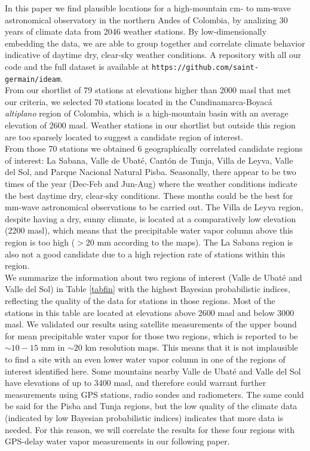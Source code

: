 \documentclass[12pt]{iopart}
\begin{document}
In this paper we find plausible locations for a high-mountain cm- to mm-wave astronomical observatory in the northern Andes of Colombia, by analizing 30 years of climate data from 2046 weather stations. By low-dimensionally embedding the data, we are able to group together and correlate climate behavior indicative of daytime dry, clear-sky weather conditions.  A repository with all our code and the full dataset is available at \texttt{https://github.com/saint-germain/ideam}.\\

From our shortlist of 79 stations at elevations higher than 2000 masl that met our criteria, we selected 70 stations located  in the Cundinamarca-Boyac\'a \emph{altiplano} region of Colombia, which is a high-mountain basin with an average elevation of 2600 masl. Weather stations in our shortlist but outside this region are too sparsely located to suggest a candidate region of interest. \\

From those 70 stations we obtained 6 geographically correlated candidate regions of interest: La Sabana, Valle de Ubat\'e, Cant\'on de Tunja, Villa de Leyva, Valle del Sol, and Parque Nacional Natural Pisba. Seasonally, there appear to be two times of the year (Dec-Feb and Jun-Aug) where the weather conditions indicate the best daytime dry, clear-sky conditions. These months could be the best for mm-wave astronomical observations to be carried out. The Villa de Leyva region, despite having a dry, sunny climate, is located at a comparatively low elevation (2200 masl), which means that the precipitable water vapor column above this region is too high ($>20$ mm according to the \cite{suen2016} maps). The La Sabana region is also not a good candidate due to a high rejection rate of stations within this region.\\

We summarize the information about two regions of interest (Valle de Ubat\'e and Valle del Sol) in Table \ref{tabfin} with the highest Bayesian probabilistic indices, reflecting the quality of the data for stations in those regions. Most of the stations in this table are located at elevations above 2600 masl and below 3000 masl. We validated our results using satellite measurements of the upper bound for mean precipitable water vapor \cite{suen2014,suen2016} for those two regions, which is reported to be $\sim10-15$ mm in $\sim20$ km resolution maps. This means that it is not implausible to find a site with an even lower water vapor column in one of the regions of interest identified here. Some mountains nearby Valle de Ubat\'e and Valle del Sol have elevations of up to 3400 masl, and therefore could warrant further measurements using GPS stations, radio sondes and radiometers. The same could be said for the Pisba and Tunja regions, but the low quality of the climate data (indicated by low Bayesian probabilistic indices) indicates that more data is needed. For this reason, we will correlate the results for these four regions with GPS-delay water vapor measurements in our following paper.\\
\end{document}
